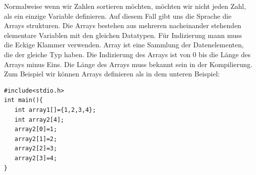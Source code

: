 \documentclass{article}[12pt]
\newenvironment{myblock}[1]{%
    \tcolorbox[beamer,%
    noparskip,breakable,
    colback=White,colframe=RoyalBlue,%
    colbacklower=TealBlue!75!White,%
    title=#1]}%
    {\endtcolorbox}
\begin{document}
Normalweise wenn wir Zahlen sortieren möchten, möchten wir nicht jeden Zahl, als
ein einzige Variable definieren. Auf diesem Fall gibt uns die Sprache die Arrays 
strukturen. Die Arrays bestehen aus mehreren nacheinander stehenden elementare 
Variablen mit den gleichen Datatypen. Für Indizierung mann muss
die Eckige Klammer verwenden. 
\begin{myblock}{Definition \texttt{Array}}
Array ist eine Sammlung der Datenelementen, die der gleiche Typ haben. Die 
Indizierung des Arrays ist von 0 bis die Länge des Arrays minus Eins.
\end{myblock}
Die Länge des Arrays muss bekannt sein in der Kompilierung. Zum Beispiel wir 
können Arrays definieren als in dem unteren Beispiel:
\begin{lstlisting}
#include<stdio.h>
int main(){
   int array1[]={1,2,3,4};
   int array2[4];
   array2[0]=1;
   array2[1]=2;
   array2[2]=3;
   array2[3]=4;
}
\end{lstlisting}
\end{document}
